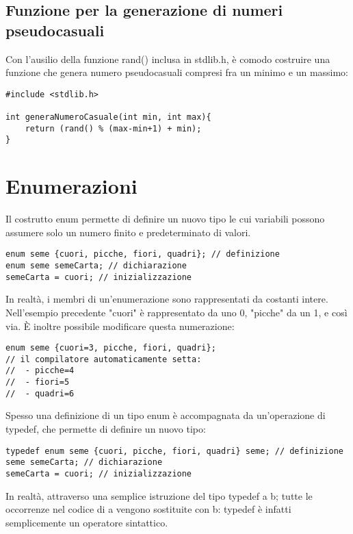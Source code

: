 \subsection{Funzione per la generazione di numeri pseudocasuali}
Con l'ausilio della funzione \colorbox{light-gray}{rand()} inclusa in \colorbox{light-gray}{stdlib.h}, è comodo costruire una funzione che genera numero pseudocasuali compresi fra un minimo e un massimo:
\begin{lstlisting}[title={Funzione per la generazione di numeri pseudocasuali}]
#include <stdlib.h>

int generaNumeroCasuale(int min, int max){
    return (rand() % (max-min+1) + min);
}
\end{lstlisting}

\section{Enumerazioni}
Il costrutto \colorbox{light-gray}{enum} permette di definire un nuovo tipo le cui variabili possono assumere solo un numero finito e predeterminato di valori.
\begin{lstlisting}[title={Utilizzo di un tipo enum}]
enum seme {cuori, picche, fiori, quadri}; // definizione
enum seme semeCarta; // dichiarazione
semeCarta = cuori; // inizializzazione
\end{lstlisting}
In realtà, i membri di un'enumerazione sono rappresentati da costanti intere. Nell'esempio precedente "cuori" è rappresentato da uno 0, "picche" da un 1, e così via. \`{E} inoltre possibile modificare questa numerazione:
\begin{lstlisting}[title={Modifica numerazione di un enum}]
enum seme {cuori=3, picche, fiori, quadri};
// il compilatore automaticamente setta:
//  - picche=4
//  - fiori=5
//  - quadri=6
\end{lstlisting}
Spesso una definizione di un tipo enum è accompagnata da un'operazione di \colorbox{light-gray}{typedef}, che permette di definire un nuovo tipo:
\begin{lstlisting}[title={Utilizzo di un tipo enum con typedef}]
typedef enum seme {cuori, picche, fiori, quadri} seme; // definizione
seme semeCarta; // dichiarazione
semeCarta = cuori; // inizializzazione
\end{lstlisting}
In realtà, attraverso una semplice istruzione del tipo \colorbox{light-gray}{typedef a b;} tutte le occorrenze nel codice di \colorbox{light-gray}{a} vengono sostituite con \colorbox{light-gray}{b}: typedef è infatti semplicemente un operatore sintattico.

